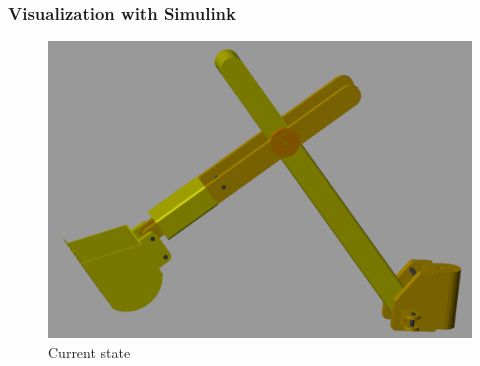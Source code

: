 \documentclass{beamer}
\begin{document}
\begin{frame}
	\frametitle{Visualization with Simulink}
	
	\begin{figure}
	\centering
	\includegraphics[width=0.7\linewidth]{img/excvis}
	\caption{Current state}
	\end{figure}

\end{frame}
\end{document}
